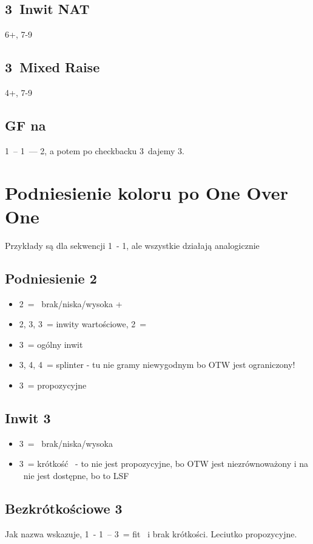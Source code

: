 \documentclass[12pt, a4paper]{article}
\begin{document}
\subsection*{3\clubs\ Inwit NAT}
6+\clubs, 7-9

\subsection*{3\diams\ Mixed Raise}
4+\diams, 7-9

\subsection*{GF na \diams}
1\diams\ -- 1\spades\ --- 2\nt, a potem po checkbacku 3\clubs\ dajemy 3\diams.


\pagebreak
\section{Podniesienie koloru po One Over One}
Przykłady są dla sekwencji 1\clubs\ - 1\hearts, ale wszystkie działają analogicznie
\subsection*{Podniesienie 2\hearts}
\begin{itemize}
    \item 2\spades\ = \lsf\ brak/niska/wysoka \inv+
    \item 2\nt, 3\clubs, 3\diams\ = inwity wartościowe, 2\nt\ = \spades
    \item 3\hearts\ = ogólny inwit
    \item 3\spades, 4\clubs, 4\diams\ = splinter - tu nie gramy niewygodnym bo OTW jest ograniczony!
    \item 3\nt\ = propozycyjne
\end{itemize}

\subsection*{Inwit 3\hearts}
\begin{itemize}
    \item 3\spades\ = \lsf\ brak/niska/wysoka
    \item 3\nt\ = krótkość \spades\ - to nie jest propozycyjne, bo OTW jest niezrównoważony i na \spades\ nie jest dostępne, bo to LSF
\end{itemize}

\subsection*{Bezkrótkościowe 3\ntx}
Jak nazwa wskazuje, 1\clubs\ - 1\hearts\ -- 3\nt\ = fit \hearts\ i brak krótkości. Leciutko propozycyjne. \vimp
\end{document}
